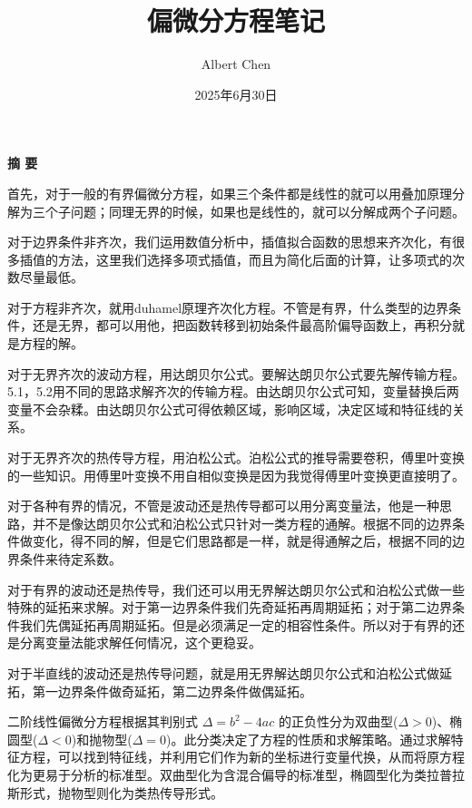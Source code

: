 \documentclass[12pt,a4paper]{article}
\title{偏微分方程笔记}
\author{Albert Chen}
\date{2025年6月30日}
\numberwithin{subsection}{section}
\numberwithin{subsubsection}{subsection}
\theoremstyle{plain}
\theoremstyle{definition}
\theoremstyle{remark}
\begin{document}
	
	\maketitle

	\newpage %
\centerline{\textbf{摘 \quad \quad \quad \quad 要}}
	 首先，对于一般的有界偏微分方程，如果三个条件都是线性的就可以用叠加原理分解为三个子问题；同理无界的时候，如果也是线性的，就可以分解成两个子问题。
	 
	 对于边界条件非齐次，我们运用数值分析中，插值拟合函数的思想来齐次化，有很多插值的方法，这里我们选择多项式插值，而且为简化后面的计算，让多项式的次数尽量最低。
	 
	 对于方程非齐次，就用duhamel原理齐次化方程。不管是有界，什么类型的边界条件，还是无界，都可以用他，把函数转移到初始条件最高阶偏导函数上，再积分就是方程的解。
	 
	 对于无界齐次的波动方程，用达朗贝尔公式。要解达朗贝尔公式要先解传输方程。5.1，5.2用不同的思路求解齐次的传输方程。由达朗贝尔公式可知，变量替换后两变量不会杂糅。由达朗贝尔公式可得依赖区域，影响区域，决定区域和特征线的关系。
	 
	 对于无界齐次的热传导方程，用泊松公式。泊松公式的推导需要卷积，傅里叶变换的一些知识。用傅里叶变换不用自相似变换是因为我觉得傅里叶变换更直接明了。
	 
	 对于各种有界的情况，不管是波动还是热传导都可以用分离变量法，他是一种思路，并不是像达朗贝尔公式和泊松公式只针对一类方程的通解。根据不同的边界条件做变化，得不同的解，但是它们思路都是一样，就是得通解之后，根据不同的边界条件来待定系数。
	 
	 对于有界的波动还是热传导，我们还可以用无界解达朗贝尔公式和泊松公式做一些特殊的延拓来求解。对于第一边界条件我们先奇延拓再周期延拓；对于第二边界条件我们先偶延拓再周期延拓。但是必须满足一定的相容性条件。所以对于有界的还是分离变量法能求解任何情况，这个更稳妥。
	 
	 对于半直线的波动还是热传导问题，就是用无界解达朗贝尔公式和泊松公式做延拓，第一边界条件做奇延拓，第二边界条件做偶延拓。

二阶线性偏微分方程根据其判别式 \(\Delta = b^2 - 4ac\) 的正负性分为双曲型(\(\Delta>0\))、椭圆型(\(\Delta<0\))和抛物型(\(\Delta=0\))。此分类决定了方程的性质和求解策略。通过求解特征方程，可以找到特征线，并利用它们作为新的坐标进行变量代换，从而将原方程化为更易于分析的标准型。双曲型化为含混合偏导的标准型，椭圆型化为类拉普拉斯形式，抛物型则化为类热传导形式。

\newpage
	
	\tableofcontents  %
	
	
	\newpage
	
\end{document}
